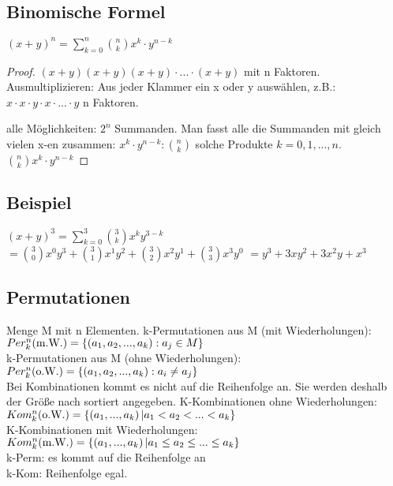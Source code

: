 \subsection{Binomische Formel}
$ (x+y)^n = \sum_{k=0}^{n} \binom{n}{k} x^k \cdot y^{n-k} $

\begin{proof}
$(x+y)(x+y)(x+y)\cdot ... \cdot (x+y)$ mit n Faktoren. Ausmultiplizieren: Aus jeder Klammer ein x oder y auswählen, z.B.: 
$x\cdot x\cdot y\cdot x\cdot ... \cdot y$ n Faktoren. 

alle Möglichkeiten: $2^n$ Summanden. Man fasst alle die Summanden mit gleich vielen x-en zusammen: 
$x^k\cdot y^{n-k} : \binom{n}{k}$ solche Produkte $k=0,1,...,n$.\\
$\binom{n}{k} x^k\cdot y^{n-k}$
\end{proof}

\subsection{Beispiel}
$(x+y)^3=\sum_{k=0}^{3} \binom{3}{k} x^k y^{3-k}$
$=\binom{3}{0} x^0 y^3 + \binom{3}{1} x^1 y^2 + \binom{3}{2} x^2 y^1 + \binom{3}{3} x^3 y^0$
$=y^3 + 3 x y^2 + 3 x^2 y + x^3$

\subsection{Permutationen}
Menge M mit n Elementen. k-Permutationen aus M (mit Wiederholungen):  
$Per_k^n(\textrm{m.W.}) =  \left\lbrace  \left( a_1,a_2,...,a_k \right)  : a_j \in M \right\rbrace $\\

k-Permutationen aus M (ohne Wiederholungen): 
$Per_k^n(\textrm{o.W.}) =  \left\lbrace  \left( a_1,a_2,...,a_k \right)  : a_i \neq a_j \right\rbrace $\\

Bei Kombinationen kommt es nicht auf die Reihenfolge an. Sie werden deshalb der Größe nach sortiert angegeben. 
K-Kombinationen ohne Wiederholungen: $Kom_k^n (\textrm{o.W.}) =  \left\lbrace  \left( a_1,...,a_k \right)  | a_1<a_2<...<a_k \right\rbrace $\\

K-Kombinationen mit Wiederholungen: $Kom_k^n (\textrm{m.W.}) =  \left\lbrace  \left( a_1,...,a_k \right)  | a_1\leq a_2\leq ...\leq a_k \right\rbrace $\\

k-Perm: es kommt auf die Reihenfolge an\\
k-Kom: Reihenfolge egal. 